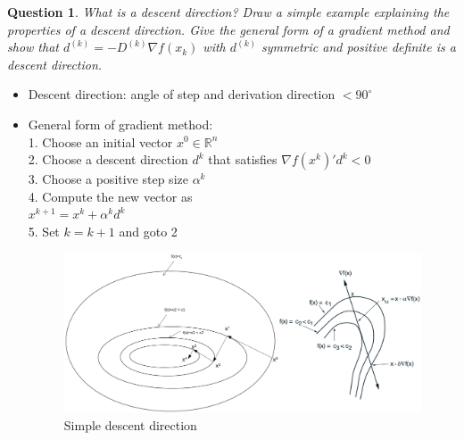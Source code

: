 \documentclass{article}
\newtheorem{question}{Question}
\newcommand{\kth}[2][k]{#2^{(#1)}}
\begin{document}
\begin{question}
  What is a descent direction? Draw a simple example explaining the properties of a descent
  direction. Give the general form of a gradient method and show that
  \(\kth{d} = -\kth{D} \nabla f(x_k)\) with \(\kth{d}\) symmetric and positive definite is a descent
  direction.
\end{question}
\begin{itemize}
\item Descent direction: angle of step and derivation direction $< 90^\circ$
\item General form of gradient method: \\
  1. Choose an initial vector $x ^0 \in \mathbb{R}^n$\\
  2. Choose a descent direction $d^k$ that satisfies $\nabla f (x^k)'  d^k < 0$\\
  3. Choose a positive step size $\alpha^k$\\
  4. Compute the new vector as\\
  $x^{k+1} = x^k + \alpha^k d^k$\\
  5. Set $k = k + 1$ and goto 2
  \begin{figure}[H]
    \includegraphics[width=\textwidth]{desc_dir.png}
    \caption{Simple descent direction\label{fig:desc_dir}}
  \end{figure}
\end{itemize}
\end{document}
